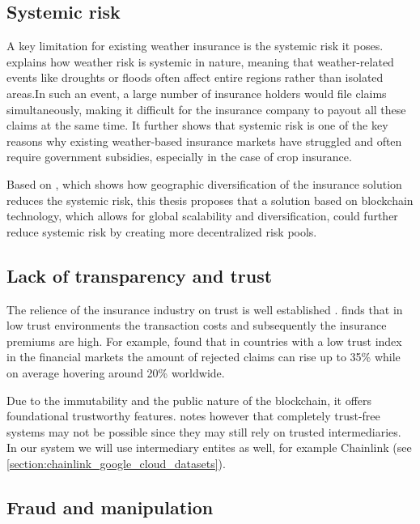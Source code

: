 \subsection{Systemic risk}

A key limitation for existing weather insurance is the systemic risk it poses. \autocite{xu2010systemic} explains how weather risk is systemic in nature, meaning that weather-related events like droughts or floods often affect entire regions rather than isolated areas.In such an event, a large number of insurance holders would file claims simultaneously, making it difficult for the insurance company to payout all these claims at the same time. It further shows that systemic risk is one of the key reasons why existing weather-based insurance markets have struggled and often require government subsidies, especially in the case of crop insurance. 

Based on \autocite{salgueiro2021diversification}, which shows how geographic diversification of the insurance solution reduces the systemic risk, this thesis proposes that a solution based on blockchain technology, which allows for global scalability and diversification, could further reduce systemic risk by creating more decentralized risk pools.

\subsection{Lack of transparency and trust}

The relience of the insurance industry on trust is well established \autocite{courbage2021trust}. \autocite{guiso2012trust} finds that in low trust environments the transaction costs and subsequently the insurance premiums are high. For example, \autocite{gennaioli2022trust} found that in countries with a low trust index in the financial markets the amount of rejected claims can rise up to 35\% while on average hovering around 20\% worldwide. 

Due to the immutability and the public nature of the blockchain, it offers foundational trustworthy features. \autocite{hawlitschek2018limits} notes however that completely trust-free systems may not be possible since they may still rely on trusted intermediaries. In our system we will use intermediary entites as well, for example Chainlink (see \cref{section:chainlink_google_cloud_datasets}).

\subsection{Fraud and manipulation}

